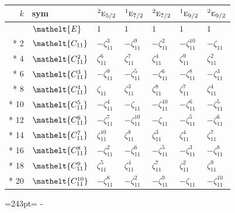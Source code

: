 \documentclass[10pt,a4paper]{article}
\newcommand{\needspace}[1]{\par\penalty-100\begingroup\dimen0=#1\relax\dimen2=\pagegoal
  \advance\dimen2-\pagetotal\ifdim\dimen0>\dimen2\relax\ifdim\dimen2>0pt\vfil\break\fi\fi
  \endgroup}
\numberwithin{equation}{section}
\newcommand{\eltfont}[1]{{\let\sigma\eltsigma\mathelt{#1}}}
\newcommand{\irr}[1]{\text{\normalfont\scshape #1}}
\newcommand{\conjpair}[1]{{}^{#1}}
\newcommand{\cls}[1]{\eltfont{#1}}
\newcommand{\rootunity}[1]{\zeta_{#1}}
\begin{document}
{\small\setlength{\tabcolsep}{4pt}
\begin{longtable}{@{}rllllll@{}}\toprule
$k$ & sym & $\conjpair{2}\irr{e}_{5/2}$ & $\conjpair{1}\irr{e}_{7/2}$ & $\conjpair{2}\irr{e}_{7/2}$ & $\conjpair{1}\irr{e}_{9/2}$ & $\conjpair{2}\irr{e}_{9/2}$\\\midrule\endhead
\bottomrule\endfoot\endlastfoot
0 & $\cls{E}$ & $1$ & $1$ & $1$ & $1$ & $1$\\*
2 & $\cls{C_{11}}$ & $-\rootunity{11}^{3}$ & $-\rootunity{11}^{9}$ & $-\rootunity{11}^{2}$ & $-\rootunity{11}^{10}$ & $-\rootunity{11}$\\*
4 & $\cls{C_{11}^{2}}$ & $\rootunity{11}^{6}$ & $\rootunity{11}^{7}$ & $\rootunity{11}^{4}$ & $\rootunity{11}^{9}$ & $\rootunity{11}^{2}$\\*
6 & $\cls{C_{11}^{3}}$ & $-\rootunity{11}^{9}$ & $-\rootunity{11}^{5}$ & $-\rootunity{11}^{6}$ & $-\rootunity{11}^{8}$ & $-\rootunity{11}^{3}$\\*
8 & $\cls{C_{11}^{4}}$ & $\rootunity{11}$ & $\rootunity{11}^{3}$ & $\rootunity{11}^{8}$ & $\rootunity{11}^{7}$ & $\rootunity{11}^{4}$\\*
10 & $\cls{C_{11}^{5}}$ & $-\rootunity{11}^{4}$ & $-\rootunity{11}$ & $-\rootunity{11}^{10}$ & $-\rootunity{11}^{6}$ & $-\rootunity{11}^{5}$\\*
12 & $\cls{C_{11}^{6}}$ & $-\rootunity{11}^{7}$ & $-\rootunity{11}^{10}$ & $-\rootunity{11}$ & $-\rootunity{11}^{5}$ & $-\rootunity{11}^{6}$\\*
14 & $\cls{C_{11}^{7}}$ & $\rootunity{11}^{10}$ & $\rootunity{11}^{8}$ & $\rootunity{11}^{3}$ & $\rootunity{11}^{4}$ & $\rootunity{11}^{7}$\\*
16 & $\cls{C_{11}^{8}}$ & $-\rootunity{11}^{2}$ & $-\rootunity{11}^{6}$ & $-\rootunity{11}^{5}$ & $-\rootunity{11}^{3}$ & $-\rootunity{11}^{8}$\\*
18 & $\cls{C_{11}^{9}}$ & $\rootunity{11}^{5}$ & $\rootunity{11}^{4}$ & $\rootunity{11}^{7}$ & $\rootunity{11}^{2}$ & $\rootunity{11}^{9}$\\*
20 & $\cls{C_{11}^{10}}$ & $-\rootunity{11}^{8}$ & $-\rootunity{11}^{2}$ & $-\rootunity{11}^{9}$ & $-\rootunity{11}$ & $-\rootunity{11}^{10}$\\
\bottomrule\end{longtable}}
\needspace{243pt}
\end{document}

